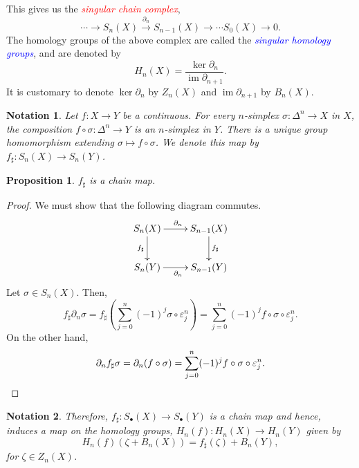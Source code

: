 \documentclass[10pt]{article}
\theoremstyle{thmstyle}
\newtheorem{proposition}[theorem]{Proposition}
\theoremstyle{defstyle}
\newtheorem*{notation}{Notation}
\newcommand{\im}{\operatorname{im}}
\newcommand{\define}[1]{\textcolor{blue}{\textit{#1}}}
\newcommand{\important}[1]{\textcolor{red}{\textit{#1}}}
\begin{document}
This gives us the \important{singular chain complex}, 
\begin{equation*}
    \cdots\longrightarrow S_{n}(X)\stackrel{\partial_n}{\longrightarrow} S_{n - 1}(X)\longrightarrow\cdots S_0(X)\longrightarrow 0.
\end{equation*}
The homology groups of the above complex are called the \define{singular homology groups}, and are denoted by 
\begin{equation*}
    H_n(X) = \frac{\ker\partial_n}{\im\partial_{n + 1}}.
\end{equation*}
It is customary to denote $\ker\partial_n$ by $Z_n(X)$ and $\im\partial_{n + 1}$ by $B_n(X)$. 

\begin{notation}
    Let $f: X\to Y$ be a continuous. For every $n$-simplex $\sigma: \Delta^n\to X$ in $X$, the composition $f\circ\sigma: \Delta^n\to Y$ is an $n$-simplex in $Y$. There is a unique group homomorphism extending $\sigma\mapsto f\circ\sigma$. We denote this map by $f_\sharp: S_n(X)\to S_n(Y)$.
\end{notation}

\begin{proposition}
    $f_\sharp$ is a chain map.
\end{proposition}
\begin{proof}
    We must show that the following diagram commutes. 
    \begin{equation*}
        \xymatrix {
            S_n(X)\ar[r]^{\partial_n}\ar[d]_{f_\sharp} & S_{n - 1}(X)\ar[d]^{f_\sharp}\\
            S_n(Y)\ar[r]_{\partial_n} & S_{n - 1}(Y)
        }
    \end{equation*}
    Let $\sigma\in S_n(X)$. Then, 
    \begin{equation*}
        f_\sharp\partial_n\sigma = f_\sharp\left(\sum_{j = 0}^{n}(-1)^j\sigma\circ\varepsilon^n_j\right) = \sum_{j = 0}^n(-1)^j f\circ\sigma\circ\varepsilon^n_{j}.
    \end{equation*}
    On the other hand, 
    \begin{equation*}
        \partial_nf_\sharp\sigma = \partial_n(f\circ\sigma) = \sum_{j = 0}^n(-1)^j f\circ\sigma\circ\varepsilon^n_j.\qedhere
    \end{equation*}
\end{proof}

\begin{notation} 
    Therefore, $f_\sharp: S_\bullet(X)\to S_\bullet(Y)$ is a chain map and hence, induces a map on the homology groups, $H_n(f): H_n(X)\to H_n(Y)$ given by 
    \begin{equation*}
        H_n(f)(\zeta + B_n(X)) = f_\sharp(\zeta) + B_n(Y),
    \end{equation*}
    for $\zeta\in Z_n(X)$.
\end{notation}
\end{document}
